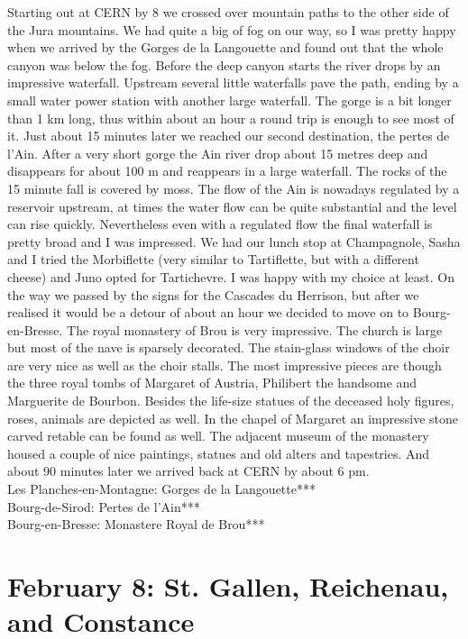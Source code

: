 Starting out at CERN by 8 we crossed over mountain paths to the other side of the Jura mountains. We had quite a big of fog on our way, so I was pretty happy when we arrived by the Gorges de la Langouette and found out that the whole canyon was below the fog. Before the deep canyon starts the river drops by an impressive waterfall. Upstream several little waterfalls pave the path, ending by a small water power station with another large waterfall. The gorge is a bit longer than 1 km long, thus within about an hour a round trip is enough to see most of it. Just about 15 minutes later we reached our second destination, the pertes de l'Ain. After a very short gorge the Ain river drop about 15 metres deep and disappears for about 100 m and reappears in a large waterfall. The rocks of the 15 minute fall is covered by moss. The flow of the Ain is nowadays regulated by a reservoir upstream, at times the water flow can be quite substantial and the level can rise quickly. Nevertheless even with a regulated flow the final waterfall is pretty broad and I was impressed. We had our lunch stop at Champagnole, Sasha and I tried the Morbiflette (very similar to Tartiflette, but with a different cheese) and Juno opted for Tartichevre. I was happy with my choice at least. On the way we passed by the signs for the Cascades du Herrison, but after we realised it would be a detour of about an hour we decided to move on to Bourg-en-Bresse. The royal monastery of Brou is very impressive. The church is large but most of the nave is sparsely decorated. The stain-glass windows of the choir are very nice as well as the choir stalls. The most impressive pieces are though the three royal tombs of Margaret of Austria, Philibert the handsome and Marguerite de Bourbon. Besides the life-size statues of the deceased holy figures, roses, animals are depicted as well. In the chapel of Margaret an impressive stone carved retable can be found as well. The adjacent museum of the monastery housed a couple of nice paintings, statues and old alters and tapestries. And about 90 minutes later we arrived back at CERN by about 6 pm.\\ 

Les Planches-en-Montagne: Gorges de la Langouette***\\
Bourg-de-Sirod: Pertes de l'Ain***\\
Bourg-en-Bresse: Monastere Royal de Brou***\\

\section{February 8: St. Gallen, Reichenau, and Constance}
\label{2020:Reichenau}


